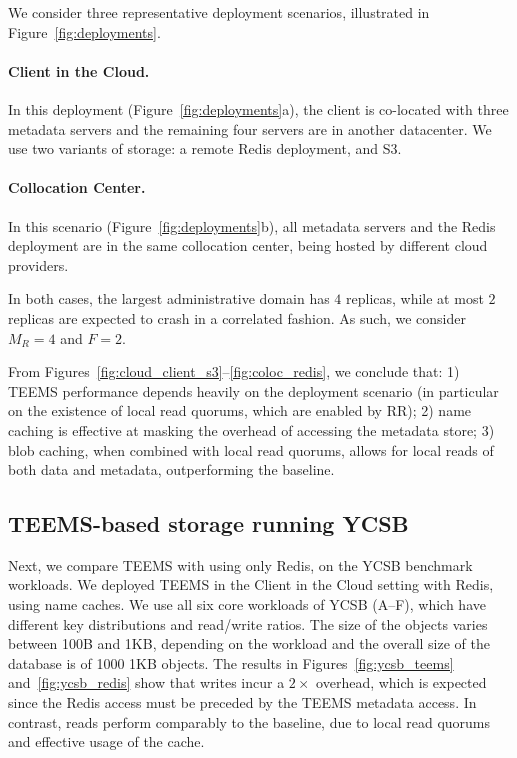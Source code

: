 We consider three representative deployment scenarios, illustrated in
Figure~\ref{fig:deployments}.

\paragraph{Client in the Cloud.}
In this deployment (Figure~\ref{fig:deployments}a), the client is
co-located with three metadata servers and the remaining four servers
are in another datacenter.  We use two variants of storage: a
remote Redis deployment, and S3.

\paragraph{Collocation Center.}
In this scenario (Figure~\ref{fig:deployments}b), all metadata
servers and the Redis deployment are in the same collocation center, being hosted by different cloud
providers.

In both cases, the largest administrative domain has $4$
replicas, while at most $2$ replicas are expected to crash
in a correlated fashion. As such, we consider $M_R = 4$ and $F= 2$.

From Figures~\ref{fig:cloud_client_s3}--\ref{fig:coloc_redis}, we
conclude that: 1) \ac{TEEMS} performance depends heavily on the deployment
scenario (in particular on the existence of local read quorums, which
are enabled by \ac{RR}); 2) name caching is effective at masking
the overhead of accessing the metadata store; 3) blob caching, when
combined with local read quorums, allows for local reads of both data
and metadata, outperforming the baseline.


\subsection{\ac{TEEMS}-based storage running \ac{YCSB}}\label{ssec:ycsb}

Next, we compare \ac{TEEMS} with using only
Redis, on the \ac{YCSB} benchmark workloads. We deployed \ac{TEEMS} in the
Client in the Cloud setting with Redis, using name caches. We use all six core workloads
of \ac{YCSB} (A--F), which have different key distributions and read/write
ratios. The size of the objects varies between 100B and 1KB, depending
on the workload and the overall size of the database is of
1000 1KB objects.
%
The results in Figures~\ref{fig:ycsb_teems} and~\ref{fig:ycsb_redis}
show that writes incur a $2\times$ overhead, which is expected since
the Redis access must be preceded by the \ac{TEEMS} metadata access. In
contrast, reads perform comparably to the baseline, due to local
read quorums and effective usage of the cache.

